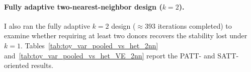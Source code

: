 \documentclass[11pt]{article}
\begin{document}



\paragraph{Fully adaptive two-nearest-neighbor design ($k=2$).}

I also ran the fully adaptive $k=2$ design ($\approx 393$ iterations completed) to examine whether requiring at least two donors recovers the stability lost under $k=1$. Tables~\ref{tab:toy_var_pooled_vs_het_2nn} and~\ref{tab:toy_var_pooled_vs_het_VE_2nn} report the PATT- and SATT-oriented results.
\end{document}
